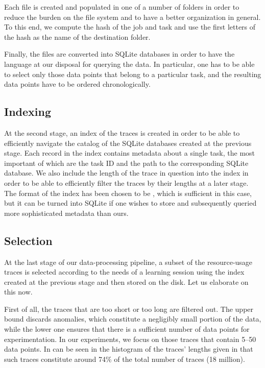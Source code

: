 Each  file is created and populated in one of a number of folders in
order to reduce the burden on the file system and to have a better organization
in general. To this end, we compute the  hash of the job and task
 and use the first letters of the hash as the name of the destination
folder.

Finally, the  files are converted into SQLite databases in order to have
the  language at our disposal for querying the data. In particular, one
has to be able to select only those data points that belong to a particular
task, and the resulting data points have to be ordered chronologically.

\subsection{Indexing} 
At the second stage, an index of the traces is created in order to be able to
efficiently navigate the catalog of the SQLite databases created at the previous
stage. Each record in the index contains metadata about a single task, the most
important of which are the task ID and the path to the corresponding SQLite
database. We also include the length of the trace in question into the index in
order to be able to efficiently filter the traces by their lengths at a later
stage. The format of the index has been chosen to be , which is
sufficient in this case, but it can be turned into SQLite if one wishes to store
and subsequently queried more sophisticated metadata than ours.

\subsection{Selection}

At the last stage of our data-processing pipeline, a subset of the
resource-usage traces is selected according to the needs of a learning session
using the index created at the previous stage and then stored on the disk. Let
us elaborate on this now.

First of all, the traces that are too short or too long are filtered out. The
upper bound discards anomalies, which constitute a negligibly small portion of
the data, while the lower one ensures that there is a sufficient number of data
points for experimentation. In our experiments, we focus on those traces that
contain 5--50 data points. In can be seen in the histogram of the traces'
lengths given in  that such traces constitute around 74\% of the
total number of traces (18 million).

